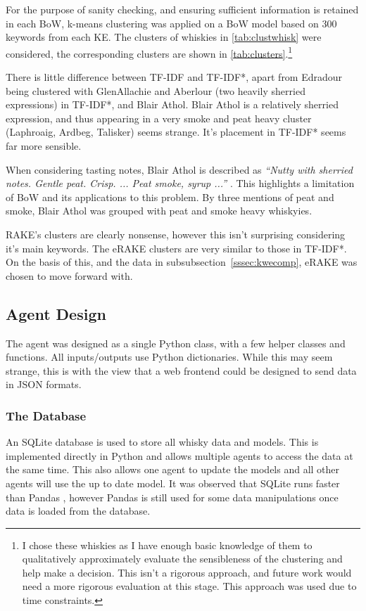 For the purpose of sanity checking, and ensuring sufficient information is retained in each BoW,
k-means clustering was applied on a BoW model based on 300 keywords from each KE. The clusters of whiskies in 
\autoref{tab:clustwhisk} were considered, the corresponding clusters are shown in \autoref{tab:clusters}.\footnote{I
chose these whiskies as I have enough basic knowledge of them to qualitatively approximately evaluate the sensibleness
of the clustering and help make a decision. This isn't a rigorous approach, and future work would need a more rigorous
evaluation at this stage.  This approach was used due to time constraints.}

There is little difference between TF-IDF and TF-IDF*, apart from Edradour being clustered with GlenAllachie and Aberlour 
(two heavily sherried expressions) in TF-IDF*, and Blair Athol.  Blair Athol is a relatively sherried expression,
and thus appearing in a very smoke and peat heavy cluster (Laphroaig, Ardbeg, Talisker) seems strange. It's placement in 
TF-IDF* seems far more sensible.

When considering tasting notes, Blair Athol is described as 
\emph{``Nutty with sherried notes. Gentle peat. Crisp. ... Peat smoke, syrup ...''} \cite{mom_ba}.  This highlights a limitation
of BoW and its applications to this problem. By three mentions of peat and smoke, Blair Athol was grouped
with peat and smoke heavy whiskyies.

RAKE's clusters are clearly nonsense, however this isn't surprising considering it's main keywords. The eRAKE clusters
are very similar to those in TF-IDF*.  On the basis of this, and the data in subsubsection~\ref{sssec:kwecomp}, eRAKE was
chosen to move forward with.

\subsection{Agent Design}\label{ssec:phase2}
The agent was designed as a single Python class, with a few helper classes and functions.  
All inputs/outputs use Python dictionaries.  While this may seem strange, this is with the view that a web frontend
could be designed to send data in JSON formats.

\subsubsection{The Database}\label{sssec:db}
An SQLite database is used to store all whisky data and models.  This is implemented directly in Python and
allows multiple agents to access the data at the same time.  This also allows one agent to update the models
and all other agents will use the up to date model.  It was observed that SQLite runs faster than 
Pandas \cite{reback2020pandas}, however Pandas is still used 
for some data manipulations once data is loaded from the database.

